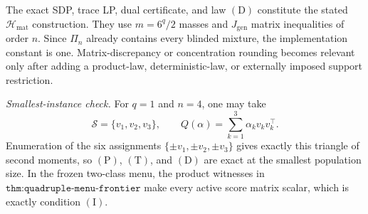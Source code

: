 The exact SDP, trace LP, dual certificate, and law \((\mathrm D)\) constitute the stated \(\mathcal H_{\mathrm{mat}}\) construction.  They use \(m=6^q/2\) masses and \(J_{\mathrm{gen}}\) matrix inequalities of order \(n\).  Since \(\Pi_n\) already contains every blinded mixture, the implementation constant is one.  Matrix-discrepancy or concentration rounding becomes relevant only after adding a product-law, deterministic-law, or externally imposed support restriction.

\textit{Smallest-instance check.}
For \(q=1\) and \(n=4\), one may take
\[
\mathscr S=\{v_1,v_2,v_3\},
\qquad
Q(\alpha)=\sum_{k=1}^3\alpha_kv_kv_k^\top.
\]
Enumeration of the six assignments \(\{\pm v_1,\pm v_2,\pm v_3\}\) gives exactly this triangle of second moments, so \((\mathrm P)\), \((\mathrm T)\), and \((\mathrm D)\) are exact at the smallest population size.  In the frozen two-class menu, the product witnesses in \(\texttt{thm:quadruple-menu-frontier}\) make every active score matrix scalar, which is exactly condition \((\mathrm I)\).